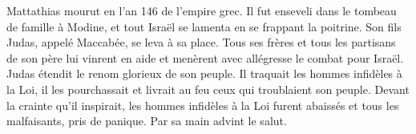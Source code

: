 Mattathias mourut en l’an 146 de l’empire grec.
Il fut enseveli dans le tombeau de famille à Modine,
	et tout Israël se lamenta en se frappant la poitrine.
Son fils Judas, appelé Maccabée, se leva à sa place.
Tous ses frères et tous les partisans de son père lui vinrent en aide
	et menèrent avec allégresse le combat pour Israël.
Judas étendit le renom glorieux de son peuple.
Il traquait les hommes infidèles à la Loi,
	il les pourchassait et livrait au feu ceux qui troublaient son peuple.
Devant la crainte qu’il inspirait, les hommes infidèles à la Loi furent abaissés
	et tous les malfaisants, pris de panique.
Par sa main advint le salut.
